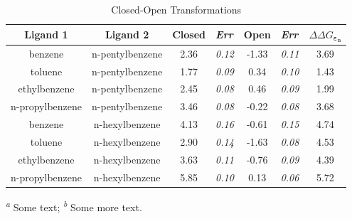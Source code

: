\documentclass[T4paper.tex]{subfiles}
\begin{document}
\begin{table}[!htb]
\centering
\caption{Closed-Open Transformations}
\label{tbl:C-O}
\begin{tabular}{|c|c|c|l|c|l|c|}
\hline
\textbf{Ligand 1}                       & \textbf{Ligand 2}                       & {\color[HTML]{800080} \textbf{Closed}} & {\color[HTML]{800080} \textit{Err}} & {\color[HTML]{008000} \textbf{Open}} & {\color[HTML]{008000} \textit{Err}} & \textbf{$\Delta\Delta G_{\boldsymbol{\varepsilon_n}}$}            \\ \hline
\cellcolor[HTML]{800080}benzene         & \cellcolor[HTML]{008000}n-pentylbenzene & 2.36                                   & \textit{0.12}                       & -1.33                                & \textit{0.11}                       & \cellcolor[HTML]{FFCCC9}3.69 \\ \hline
\cellcolor[HTML]{800080}toluene         & \cellcolor[HTML]{008000}n-pentylbenzene & 1.77                                   & \textit{0.09}                       & 0.34                                 & \textit{0.10}                       & \cellcolor[HTML]{FFCCC9}1.43 \\ \hline
\cellcolor[HTML]{800080}ethylbenzene    & \cellcolor[HTML]{008000}n-pentylbenzene & 2.45                                   & \textit{0.08}                       & 0.46                                 & \textit{0.09}                       & \cellcolor[HTML]{FFCCC9}1.99 \\ \hline
\cellcolor[HTML]{800080}n-propylbenzene & \cellcolor[HTML]{008000}n-pentylbenzene & 3.46                                   & \textit{0.08}                       & -0.22                                & \textit{0.08}                       & \cellcolor[HTML]{FFCCC9}3.68 \\ \hline
\cellcolor[HTML]{800080}benzene         & \cellcolor[HTML]{008000}n-hexylbenzene  & 4.13                                   & \textit{0.16}                       & -0.61                                & \textit{0.15}                       & \cellcolor[HTML]{FFCCC9}4.74 \\ \hline
\cellcolor[HTML]{800080}toluene         & \cellcolor[HTML]{008000}n-hexylbenzene  & 2.90                                   & \textit{0.14}                       & -1.63                                & \textit{0.08}                       & \cellcolor[HTML]{FFCCC9}4.53 \\ \hline
\cellcolor[HTML]{800080}ethylbenzene    & \cellcolor[HTML]{008000}n-hexylbenzene  & 3.63                                   & \textit{0.11}                       & -0.76                                & \textit{0.09}                       & \cellcolor[HTML]{FFCCC9}4.39 \\ \hline
\cellcolor[HTML]{800080}n-propylbenzene & \cellcolor[HTML]{008000}n-hexylbenzene  & 5.85                                   & \textit{0.10}                       & 0.13                                 & \textit{0.06}                       & \cellcolor[HTML]{FFCCC9}5.72 \\ \hline
\end{tabular}

  \textsuperscript{\emph{a}} Some text;
  \textsuperscript{\emph{b}} Some more text.
\end{table}
\end{document}
